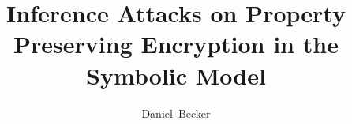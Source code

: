 \documentclass[journal]{IEEEtran}
\begin{document}
%
\title{Inference Attacks on Property Preserving Encryption in the Symbolic Model}
%
%

\author{Daniel~Becker}
% 
%
\end{document}
